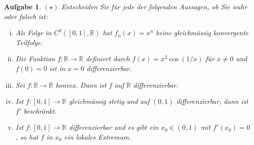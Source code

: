 \documentclass[a4paper, 20]{exam}
\newtheorem{ex}{Aufgabe}
\newcommand\RR{\mathbb{R}}
\begin{document}
\begin{ex}{$(\star)$}
Entscheiden Sie f\"ur jede der folgenden Aussagen, ob Sie wahr oder falsch ist:
\begin{enumerate}[i.)]
\item
Als Folge in $C^0([0,1], \RR)$ hat $f_n(x)=x^n$ keine gleichmässig konvergente Teilfolge.
\item
Die Funktion $f:\RR \longrightarrow \RR$ definiert durch $f(x)=x^2 \cos(1/x)$ f\"ur $x\neq0$ und $f(0)=0$ ist in $x=0$ differenzierbar.
\item
Sei $f:\RR \longrightarrow \RR$ konvex. Dann ist $f$ auf $\RR$ differenzierbar.
\item
Ist $f:[0,1] \longrightarrow \RR$ gleichm\"assig stetig und auf $(0,1)$ differenzierbar, dann ist $f'$ beschr\"ankt.
\item
Ist $f:[0,1] \longrightarrow \RR$ differenzierbar und es gibt ein $x_0\in (0,1)$ mit $f'(x_0)=0$, so hat $f$ in $x_0$ ein lokales Extremum.
\end{enumerate} 
\end{ex}
\end{document}
